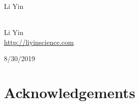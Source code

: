 \documentclass[../main.tex]{subfiles}
\begin{document}




Li Yin

\mbox{}\\
\noindent Li Yin \\
\noindent \url{http://liyinscience.com}

8/30/2019


 
\section*{Acknowledgements}
\end{document}
